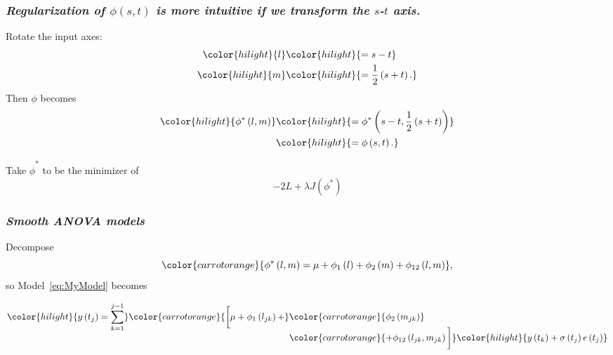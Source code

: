 \documentclass[12pt]{beamer}
\newcommand{\newmaththought}[1]{{ \color{hilight} {#1}}}
\newcommand{\carrotorangemath}[1]{{ \color{carrotorange} {#1}}}
\begin{document}
\begin{frame}
\frametitle{\emph{Regularization of $\phi\left(s,t\right)$ is more intuitive if we transform the $s$-$t$ axis. }}
Rotate the input axes:
\begin{align*}
\newmaththought{l} &\newmaththought{= s-t} \\
\newmaththought{m} &\newmaththought{= \frac{1}{2}\left(s+t\right).}
\end{align*}
\noindent
Then $\phi$ becomes
\begin{align*}
\newmaththought{\phi^*\left(l,m\right)} &\newmaththought{= \phi^*\left(s-t, \frac{1}{2}\left(s+t\right)\right)}\\
 &\newmaththought{= \phi\left(s,t\right).}
\end{align*}

Take $\hat{\phi}^*$ to be the minimizer of 
\[
-2L + \lambda J\left(\phi^*\right)
\]

\end{frame}







\begin{frame}
\frametitle{\emph{Smooth ANOVA models}}
Decompose
\begin{equation} \label{eq:SANOVA-model}
\carrotorangemath{
\phi^*\left(l,m\right) = \mu + \phi_1\left(l\right) + \phi_2\left(m\right) + \phi_{12}\left(l,m\right)},
\end{equation} 
so Model~\ref{eq:MyModel} becomes

\begin{align}  
\begin{split} \label{eq:expanded-ps-anova-vc-model}
\newmaththought{ y\left(t_j \right)  = \sum_{k=1}^{j-1}}\carrotorangemath{ \bigg[\mu + \phi_1\left(l_{jk}\right) + } &\carrotorangemath{\phi_2\left(m_{jk}\right)} \bigg.\\[-2ex]
\bigg. &\carrotorangemath{+ \phi_{12}\left(l_{jk},m_{jk}\right) \bigg]}\newmaththought{y\left(t_k\right)+ \sigma\left(t_j\right)e\left({t_j}\right)}
\end{split}
\end{align}
\end{frame}
\end{document}
